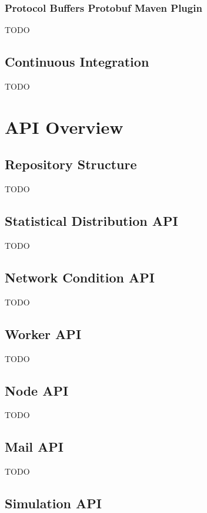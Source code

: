 \subsubsection{Protocol Buffers Protobuf Maven Plugin}

TODO

\subsection{Continuous Integration}

TODO


\section{API Overview}

\subsection{Repository Structure}

TODO

\subsection{Statistical Distribution API}

TODO

\subsection{Network Condition API}

TODO

\subsection{Worker API}

TODO

\subsection{Node API}

TODO

\subsection{Mail API}

TODO

\subsection{Simulation API}

